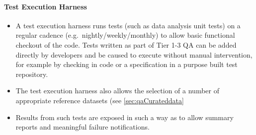 \paragraph{Test Execution Harness}
\label{sec:qaTestharness}
\begin{itemize}

\item A test execution harness runs tests (such as data analysis unit
  tests) on a regular cadence (e.g.\ nightly/weekly/monthly) to allow
  basic functional checkout of the code. Tests written as part of Tier
  1-3 QA can be added directly by developers and be caused to execute
  without manual intervention, for example by checking in code or a
  specification in a purpose built test repository.

\item The test execution harness also allows the selection of a number of appropriate reference datasets (see \ref{sec:qaCurateddata}

\item Results from such tests are exposed in such a way as to allow summary reports and meaningful failure notifications.

\end{itemize}

